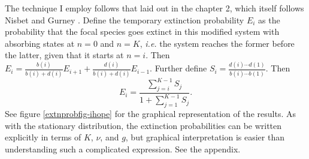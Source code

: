 The technique I employ follows that laid out in the chapter 2, which itself follows Nisbet and Gurney \cite{Nisbet1982}. 
Define the temporary extinction probability $E_i$ as the probability that the focal species goes extinct in this modified system with absorbing states at $n=0$ and $n=K$, \emph{i.e.} the system reaches the former before the latter, given that it starts at $n=i$. 
Then $E_i = \frac{b(i)}{b(i)+d(i)}E_{i+1} + \frac{d(i)}{b(i)+d(i)}E_{i-1}$. 
Further define $S_i = \frac{d(i)\cdots d(1)}{b(i)\cdots b(1)}$. 
Then 
\begin{equation}
E_{i} = \frac{\sum_{j=i}^{K-1}S_j}{1+\sum_{j=1}^{K-1}S_j}. 
 \label{extnprob}
\end{equation}
See figure \ref{extnprobfig-ihope} for the graphical representation of the results. 
As with the stationary distribution, the extinction probabilities can be written explicitly in terms of $K$, $\nu$, and $g$, but graphical interpretation is easier than understanding such a complicated expression. %
See the appendix. 

